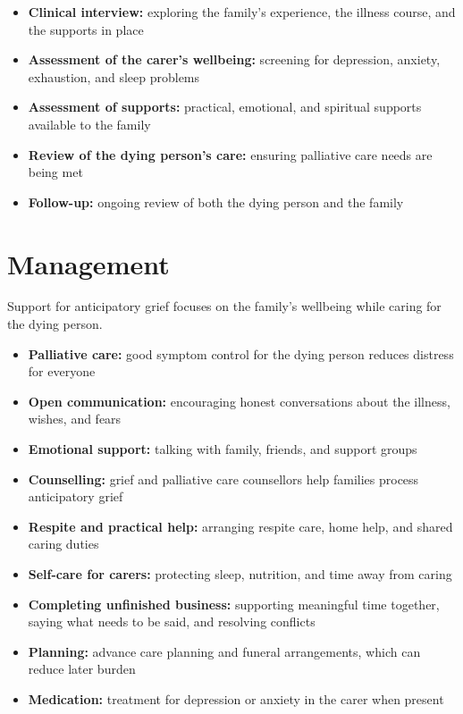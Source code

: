 \begin{itemize}
    \item \textbf{Clinical interview:} exploring the family's experience, the illness course, and the supports in place
    \item \textbf{Assessment of the carer's wellbeing:} screening for depression, anxiety, exhaustion, and sleep problems
    \item \textbf{Assessment of supports:} practical, emotional, and spiritual supports available to the family
    \item \textbf{Review of the dying person's care:} ensuring palliative care needs are being met
    \item \textbf{Follow-up:} ongoing review of both the dying person and the family
\end{itemize}

\section*{Management}
Support for anticipatory grief focuses on the family's wellbeing while caring for the dying person.

\begin{itemize}
    \item \textbf{Palliative care:} good symptom control for the dying person reduces distress for everyone
    \item \textbf{Open communication:} encouraging honest conversations about the illness, wishes, and fears
    \item \textbf{Emotional support:} talking with family, friends, and support groups
    \item \textbf{Counselling:} grief and palliative care counsellors help families process anticipatory grief
    \item \textbf{Respite and practical help:} arranging respite care, home help, and shared caring duties
    \item \textbf{Self-care for carers:} protecting sleep, nutrition, and time away from caring
    \item \textbf{Completing unfinished business:} supporting meaningful time together, saying what needs to be said, and resolving conflicts
    \item \textbf{Planning:} advance care planning and funeral arrangements, which can reduce later burden
    \item \textbf{Medication:} treatment for depression or anxiety in the carer when present
\end{itemize}

